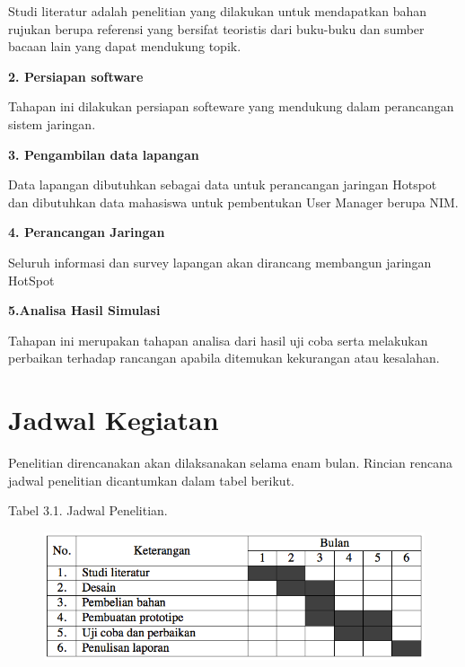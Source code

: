 \documentclass{jtetiproposalskripsi}
\begin{document}
Studi literatur adalah penelitian yang dilakukan untuk mendapatkan bahan rujukan berupa referensi yang bersifat teoristis dari buku-buku dan sumber bacaan lain yang dapat mendukung topik.

\textbf{2. Persiapan software}

Tahapan ini dilakukan persiapan softeware yang mendukung dalam perancangan sistem jaringan.

\textbf{3. Pengambilan data lapangan}

Data lapangan dibutuhkan sebagai data untuk perancangan jaringan Hotspot  dan dibutuhkan data mahasiswa untuk pembentukan  User Manager berupa NIM.

\textbf{4. Perancangan Jaringan}

Seluruh  informasi  dan  survey lapangan  akan  dirancang  membangun jaringan HotSpot

\textbf{5.Analisa Hasil Simulasi}

Tahapan ini merupakan tahapan analisa dari hasil uji coba serta melakukan perbaikan terhadap rancangan apabila ditemukan kekurangan atau kesalahan. 


\section{Jadwal Kegiatan}
Penelitian direncanakan akan dilaksanakan selama enam bulan. Rincian rencana jadwal penelitian dicantumkan dalam tabel berikut.

\begin{center}
Tabel 3.1. Jadwal Penelitian.
\end{center}
\vspace{-0.5cm}
\begin{figure}[ht!]
  \centering
    \includegraphics[width=13cm]{gambar/timeline}
\end{figure}

\end{document}
